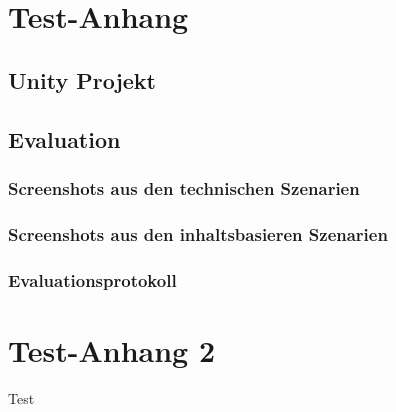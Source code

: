 \chapter{Test-Anhang}

\section{Unity Projekt}
\label{Anhang:Projekt}

\section{Evaluation}

\subsection{Screenshots aus den technischen Szenarien}
\label{Anhang:screenTechnisch}
\subsection{Screenshots aus den inhaltsbasieren Szenarien}
\label{Anhang:screenInhalt}
\subsection{Evaluationsprotokoll}
\label{Anhang:protokoll}

\cleardoublepage

\chapter{Test-Anhang 2}

Test

\cleardoublepage

